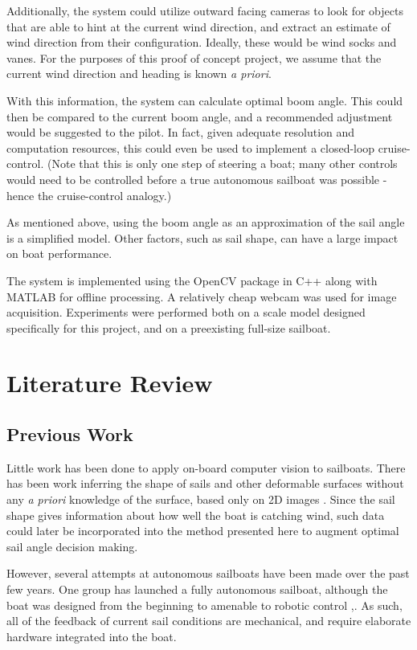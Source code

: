 \documentclass[letterpaper, 10 pt, conference]{ieeeconf}  %
\begin{document}
Additionally, the system could utilize outward facing cameras to look for objects that are able to hint at the current wind direction, and extract an estimate of wind direction from their configuration. Ideally, these would be wind socks and vanes. For the purposes of this proof of concept project, we assume that the current wind direction and heading is known \emph{a priori}.

With this information, the system can calculate optimal boom angle. This could then be compared to the current boom angle, and a recommended adjustment would be suggested to the pilot. In fact, given adequate resolution and computation resources, this could even be used to implement a closed-loop cruise-control. (Note that this is only one step of steering a boat; many other controls would need to be controlled before a true autonomous sailboat was possible - hence the cruise-control analogy.)

As mentioned above, using the boom angle as an approximation of the sail angle is a simplified model. Other factors, such as sail shape, can have a large impact on boat performance.

The system is implemented using the OpenCV package in C++ along with MATLAB for offline processing. A relatively cheap webcam was used for image acquisition. Experiments were performed both on a scale model designed specifically for this project, and on a preexisting full-size sailboat. 

\section{Literature Review}
\subsection{Previous Work}
Little work has been done to apply on-board computer vision to sailboats. There has been work inferring the shape of sails and other deformable surfaces without any \emph{a priori} knowledge of the surface, based only on 2D images \cite{Pilet:2008}. Since the sail shape gives information about how well the boat is catching wind, such data could later be incorporated into the method presented here to augment optimal sail angle decision making. 
 
However, several attempts at autonomous sailboats have been made over the past few years. One group has launched a fully autonomous sailboat, although the boat was designed from the beginning to amenable to robotic control \cite{Stelzer:2011},\cite{Sauz:2013}. As such, all of the feedback of current sail conditions are mechanical, and require elaborate hardware integrated into the boat. 
\end{document}
